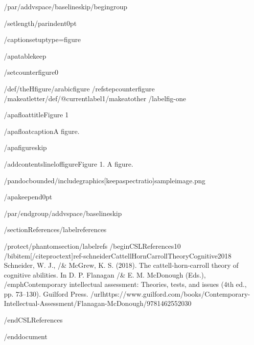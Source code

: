 /par/addvspace{/baselineskip}/begingroup

/setlength{/parindent}{0pt}

/captionsetup{type=figure}

/apatablekeep

/setcounter{figure}{0}

/def/theHfigure{/arabic{figure}}%
/refstepcounter{figure}%
/makeatletter/def/@currentlabel{1}/makeatother%
/label{fig-one}

/apafloattitle{Figure 1}

/apafloatcaption{A figure.}

/apafigureskip

/addcontentsline{lof}{figure}{Figure 1. A figure.}

/pandocbounded{/includegraphics[keepaspectratio]{sampleimage.png}}

/apakeepend{0pt}

/par/endgroup/addvspace{/baselineskip}

/section{References}/label{references}

/protect/phantomsection/label{refs}
/begin{CSLReferences}{1}{0}
/bibitem[/citeproctext]{ref-schneiderCattellHornCarrollTheoryCognitive2018}
Schneider, W. J., /& McGrew, K. S. (2018). The cattell-horn-carroll
theory of cognitive abilities. In D. P. Flanagan /& E. M. McDonough
(Eds.), /emph{Contemporary intellectual assessment: Theories, tests, and
issues} (4th ed., pp. 73--130). Guilford Press.
/url{https://www.guilford.com/books/Contemporary-Intellectual-Assessment/Flanagan-McDonough/9781462552030}

/end{CSLReferences}




/end{document}

